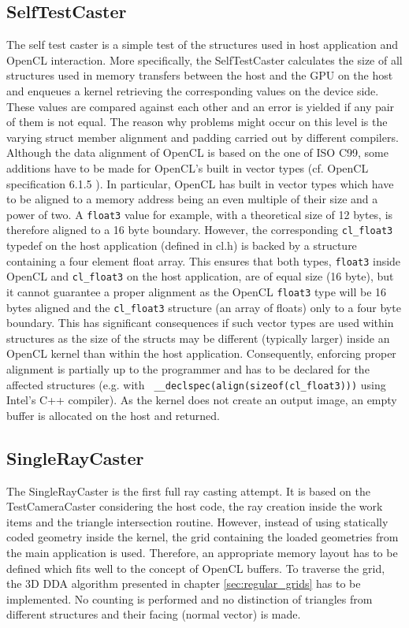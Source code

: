 \subsection{SelfTestCaster}

The self test caster is a simple test of the structures used in host application and OpenCL interaction. More specifically, the SelfTestCaster calculates the size of all structures used in memory transfers between the host and the GPU on the host and enqueues a kernel retrieving the corresponding values on the device side. These values are compared against each other and an error is yielded if any pair of them is not equal.
The reason why problems might occur on this level is the varying struct member alignment and padding carried out by different compilers. Although the data alignment of OpenCL is based on the one of ISO C99, some additions have to be made for OpenCL's built in vector types (cf. OpenCL specification 6.1.5 \cite{opencl_spec}). In particular, OpenCL has built in vector types which have to be aligned to a memory address being an even multiple of their size and a power of two. A \lstinline!float3! value for example, with a theoretical size of 12 bytes, is therefore aligned to a 16 byte boundary. However, the corresponding \lstinline!cl_float3! typedef on the host application (defined in cl.h) is backed by a structure containing a four element float array. This ensures that both types, \lstinline!float3! inside OpenCL and \lstinline!cl_float3! on the host application, are of equal size (16 byte), but it cannot guarantee a proper alignment as the OpenCL \lstinline!float3! type will be 16 bytes aligned and the \lstinline!cl_float3! structure (an array of floats) only to a four byte boundary. This has significant consequences if such vector types are used within structures as the size of the structs may be different (typically larger) inside an OpenCL kernel than within the host application. Consequently, enforcing proper alignment is partially up to the programmer and has to be declared for the affected structures (e.g. with \lstinline! __declspec(align(sizeof(cl_float3)))! using Intel's C++ compiler).
As the kernel does not create an output image, an empty buffer is allocated on the host and returned.


\subsection{SingleRayCaster}

The SingleRayCaster is the first full ray casting attempt. It is based on the TestCameraCaster considering the host code, the ray creation inside the work items and the triangle intersection routine. However, instead of using statically coded geometry inside the kernel, the grid containing the loaded geometries from the main application is used. Therefore, an appropriate memory layout has to be defined which fits well to the concept of OpenCL buffers. To traverse the grid, the 3D DDA algorithm presented in chapter \ref{sec:regular_grids} has to be implemented. No counting is performed and no distinction of triangles from different structures and their facing (normal vector) is made.

